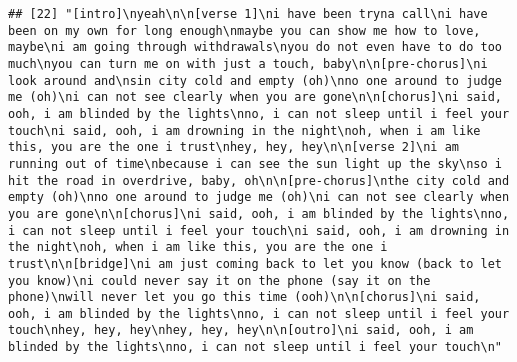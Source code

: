 \documentclass[]{article}
\begin{document}
\begin{verbatim}
## [22] "[intro]\nyeah\n\n[verse 1]\ni have been tryna call\ni have been on my own for long enough\nmaybe you can show me how to love, maybe\ni am going through withdrawals\nyou do not even have to do too much\nyou can turn me on with just a touch, baby\n\n[pre-chorus]\ni look around and\nsin city cold and empty (oh)\nno one around to judge me (oh)\ni can not see clearly when you are gone\n\n[chorus]\ni said, ooh, i am blinded by the lights\nno, i can not sleep until i feel your touch\ni said, ooh, i am drowning in the night\noh, when i am like this, you are the one i trust\nhey, hey, hey\n\n[verse 2]\ni am running out of time\nbecause i can see the sun light up the sky\nso i hit the road in overdrive, baby, oh\n\n[pre-chorus]\nthe city cold and empty (oh)\nno one around to judge me (oh)\ni can not see clearly when you are gone\n\n[chorus]\ni said, ooh, i am blinded by the lights\nno, i can not sleep until i feel your touch\ni said, ooh, i am drowning in the night\noh, when i am like this, you are the one i trust\n\n[bridge]\ni am just coming back to let you know (back to let you know)\ni could never say it on the phone (say it on the phone)\nwill never let you go this time (ooh)\n\n[chorus]\ni said, ooh, i am blinded by the lights\nno, i can not sleep until i feel your touch\nhey, hey, hey\nhey, hey, hey\n\n[outro]\ni said, ooh, i am blinded by the lights\nno, i can not sleep until i feel your touch\n"                                                                                                                                                                                                                                                                                                                                                                                                                                                                                                                                                                                                                                                                                                                                                                                                                                                                                                                                                                                                                                                                                                                                                                                                                                                                                                                                                                                                                                                                                                         

\end{verbatim}
\end{document}
